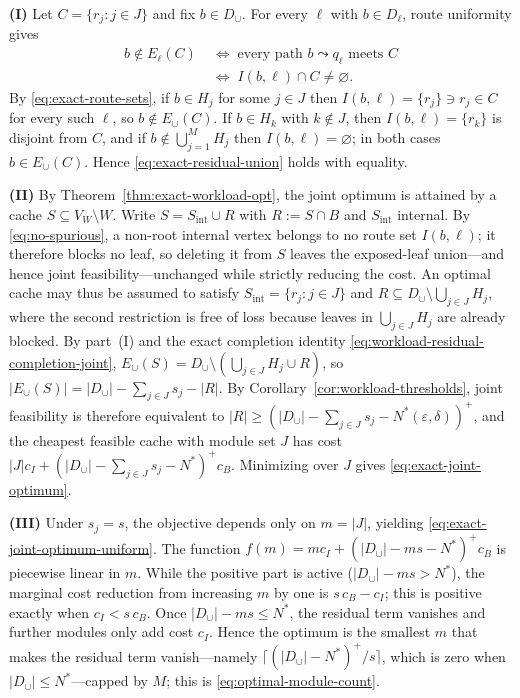 \documentclass[journal]{IEEEtran}
\makeatletter
\numberwithin{equation}{section}
\renewenvironment{proof}[1][\proofname]{\par
  \pushQED{\qed}%
  \normalfont \topsep6\p@\@plus6\p@\relax
  \trivlist
  \item[\hskip\labelsep
        \itshape
    #1\@addpunct{.}]\ignorespaces
}{%
  \popQED\endtrivlist\@endpefalse
}
\makeatother
\begin{document}
\begin{proof}
\textbf{(I)}  Let \(C=\{r_j:j\in J\}\) and fix \(b\in D_{\cup}\).  For every \(\ell\) with \(b\in D_\ell\), route uniformity gives
\begin{align*}
  b\notin E_\ell(C)
  &\;\Longleftrightarrow\;
  \text{every path } b\leadsto q_\ell \text{ meets } C \\
  &\;\Longleftrightarrow\;
  I(b,\ell)\cap C\neq\varnothing .
\end{align*}
By \eqref{eq:exact-route-sets}, if \(b\in H_j\) for some \(j\in J\) then
\(I(b,\ell)=\{r_j\}\ni r_j\in C\) for every such \(\ell\), so
\(b\notin E_{\cup}(C)\).  If \(b\in H_k\) with \(k\notin J\), then
\(I(b,\ell)=\{r_k\}\) is disjoint from \(C\), and if
\(b\notin\bigcup_{j=1}^{M}H_j\) then \(I(b,\ell)=\varnothing\); in both
cases \(b\in E_{\cup}(C)\).  Hence
\eqref{eq:exact-residual-union} holds with equality.

\textbf{(II)}  By Theorem~\ref{thm:exact-workload-opt}, the joint optimum is
attained by a cache \(S\subseteq V_W\setminus W\).  Write
\(S=S_{\mathrm{int}}\cup R\) with \(R:=S\cap B\) and \(S_{\mathrm{int}}\)
internal.  By \eqref{eq:no-spurious}, a non-root internal vertex belongs to
no route set \(I(b,\ell)\); it therefore blocks no leaf, so deleting it from
\(S\) leaves the exposed-leaf union---and hence joint
feasibility---unchanged while strictly reducing the cost.  An optimal cache
may thus be assumed to satisfy
\(S_{\mathrm{int}}=\{r_j:j\in J\}\) and
\(R\subseteq D_{\cup}\setminus\bigcup_{j\in J}H_j\),
where the second restriction is free of loss because leaves in
\(\bigcup_{j\in J}H_j\) are already blocked.  By part~(I) and the exact
completion identity \eqref{eq:workload-residual-completion-joint},
\(E_{\cup}(S)=D_{\cup}\setminus(\bigcup_{j\in J}H_j\cup R)\), so
\(|E_{\cup}(S)|=|D_{\cup}|-\sum_{j\in J}s_j-|R|\).
By Corollary~\ref{cor:workload-thresholds}, joint feasibility is therefore
equivalent to
\(|R|\ge(|D_{\cup}|-\sum_{j\in J}s_j-N^*(\varepsilon,\delta))^+\),
and the cheapest feasible cache with module set \(J\) has cost
\(|J|c_I+(|D_{\cup}|-\sum_{j\in J}s_j-N^*)^+c_B\).
Minimizing over \(J\) gives \eqref{eq:exact-joint-optimum}.

\textbf{(III)}  Under \(s_j=s\), the objective depends only on \(m=|J|\),
yielding \eqref{eq:exact-joint-optimum-uniform}.  The function
\(f(m)=m c_I+(|D_{\cup}|-ms-N^*)^+c_B\)
is piecewise linear in \(m\).  While the positive part is active
(\(|D_{\cup}|-ms>N^*\)), the marginal cost reduction from increasing \(m\)
by one is \(s\,c_B-c_I\); this is positive exactly when \(c_I<s\,c_B\).  Once
\(|D_{\cup}|-ms\le N^*\), the residual term vanishes and further modules only
add cost \(c_I\).  Hence the optimum is the smallest \(m\) that makes the
residual term vanish---namely \(\bigl\lceil(|D_{\cup}|-N^*)^+/s\bigr\rceil\),
which is zero when \(|D_{\cup}|\le N^*\)---capped by \(M\); this is
\eqref{eq:optimal-module-count}.
\end{proof}
\end{document}
